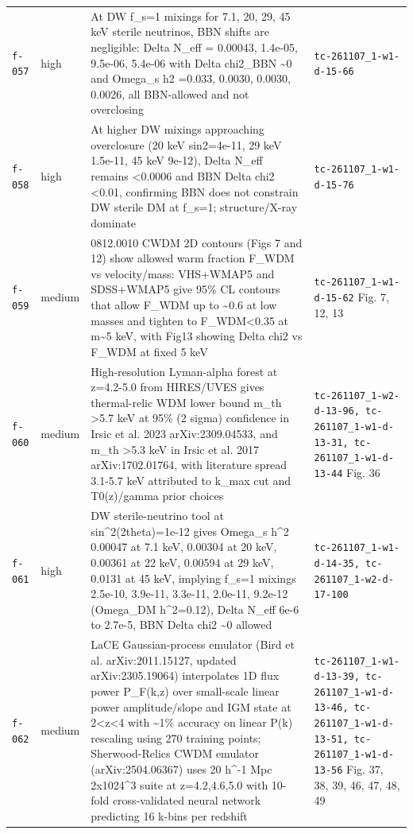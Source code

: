 \documentclass[11pt,a4paper]{article}
\begin{document}
\begin{longtable}{@{}p{}p{}p{}p{}@{}}
\texttt{f-057} & high & At DW f\_s=1 mixings for 7.1, 20, 29, 45 keV sterile neutrinos, BBN shifts are negligible: Delta N\_eff = 0.00043, 1.4e-05, 9.5e-06, 5.4e-06 with Delta chi2\_BBN \textasciitilde{}0 and Omega\_s h2 =0.033, 0.0030, 0.0030, 0.0026, all BBN-allowed and not overclosing & \texttt{tc-261107\_\allowbreak{}1-w1-d-15-66} \\
\texttt{f-058} & high & At higher DW mixings approaching overclosure (20 keV sin2=4e-11, 29 keV 1.5e-11, 45 keV 9e-12), Delta N\_eff remains \textless{}0.0006 and BBN Delta chi2 \textless{}0.01, confirming BBN does not constrain DW sterile DM at f\_s=1; structure/X-ray dominate & \texttt{tc-261107\_\allowbreak{}1-w1-d-15-76} \\
\texttt{f-059} & medium & 0812.0010 CWDM 2D contours (Figs 7 and 12) show allowed warm fraction F\_WDM vs velocity/mass: VHS+WMAP5 and SDSS+WMAP5 give 95\% CL contours that allow F\_WDM up to \textasciitilde{}0.6 at low masses and tighten to F\_WDM\textless{}0.35 at m\textasciitilde{}5 keV, with Fig13 showing Delta chi2 vs F\_WDM at fixed 5 keV & \texttt{tc-261107\_\allowbreak{}1-w1-d-15-62} Fig. 7, 12, 13 \\
\texttt{f-060} & medium & High-resolution Lyman-alpha forest at z=4.2-5.0 from HIRES/UVES gives thermal-relic WDM lower bound m\_th \textgreater{}5.7 keV at 95\% (2 sigma) confidence in Irsic et al. 2023 arXiv:2309.04533, and m\_th \textgreater{}5.3 keV in Irsic et al. 2017 arXiv:1702.01764, with literature spread 3.1-5.7 keV attributed to k\_max cut and T0(z)/gamma prior choices & \texttt{tc-261107\_\allowbreak{}1-w2-d-13-96,\allowbreak{} tc-261107\_\allowbreak{}1-w1-d-13-31,\allowbreak{} tc-261107\_\allowbreak{}1-w1-d-13-44} Fig. 36 \\
\texttt{f-061} & high & DW sterile-neutrino tool at sin\textasciicircum{}2(2theta)=1e-12 gives Omega\_s h\textasciicircum{}2 0.00047 at 7.1 keV, 0.00304 at 20 keV, 0.00361 at 22 keV, 0.00594 at 29 keV, 0.0131 at 45 keV, implying f\_s=1 mixings 2.5e-10, 3.9e-11, 3.3e-11, 2.0e-11, 9.2e-12 (Omega\_DM h\textasciicircum{}2=0.12), Delta N\_eff 6e-6 to 2.7e-5, BBN Delta chi2 \textasciitilde{}0 allowed & \texttt{tc-261107\_\allowbreak{}1-w1-d-14-35,\allowbreak{} tc-261107\_\allowbreak{}1-w2-d-17-100} \\
\texttt{f-062} & medium & LaCE Gaussian-process emulator (Bird et al. arXiv:2011.15127, updated arXiv:2305.19064) interpolates 1D flux power P\_F(k,z) over small-scale linear power amplitude/slope and IGM state at 2\textless{}z\textless{}4 with \textasciitilde{}1\% accuracy on linear P(k) rescaling using 270 training points; Sherwood-Relics CWDM emulator (arXiv:2504.06367) uses 20 h\textasciicircum{}-1 Mpc 2x1024\textasciicircum{}3 suite at z=4.2,4.6,5.0 with 10-fold cross-validated neural network predicting 16 k-bins per redshift & \texttt{tc-261107\_\allowbreak{}1-w1-d-13-39,\allowbreak{} tc-261107\_\allowbreak{}1-w1-d-13-46,\allowbreak{} tc-261107\_\allowbreak{}1-w1-d-13-51,\allowbreak{} tc-261107\_\allowbreak{}1-w1-d-13-56} Fig. 37, 38, 39, 46, 47, 48, 49 \\

\end{longtable}
\end{document}
